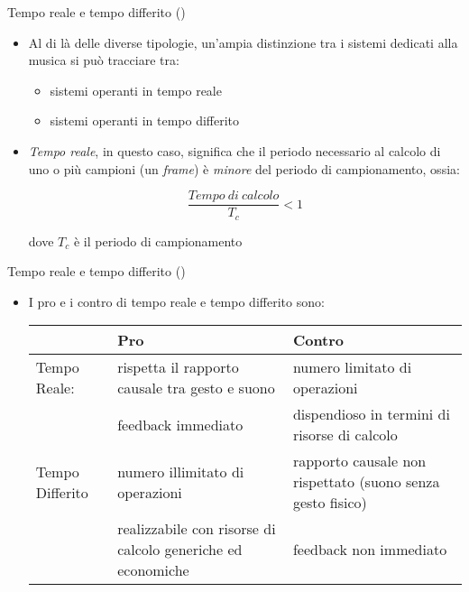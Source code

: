 \setcounter{ms}{1}
\begin{slide}{Tempo reale e tempo differito ()}
{

	\begin{itemize}
	\setlength{\itemsep}{2mm}

		\item Al di l\`a delle diverse tipologie,
		      un'ampia distinzione tra i sistemi dedicati alla musica
              si pu\`o tracciare tra:

			  \begin{itemize}

				\item sistemi operanti in tempo reale

				\item sistemi operanti in tempo differito

			  \end{itemize}

		\item \emph{Tempo reale}, in questo caso, significa che
			  il periodo necessario al calcolo di uno o pi\`u campioni
			  (un \emph{frame}) \`e \emph{minore} del periodo di campionamento,
			  ossia:

			  \begin{equation}
				\frac{Tempo~di~calcolo}{T_c} < 1 \nonumber
			  \end{equation}

              dove $T_c$ \`e il periodo di campionamento

	\end{itemize}
}
\end{slide}

\begin{slide}{Tempo reale e tempo differito ()}
{

	\begin{itemize}

		\item I pro e i contro di tempo reale e tempo differito sono:
		
			\vspace{2mm}
			{\scriptsize
			\begin{tabular}{| p{} | p{0.3\textwidth} | p{} |}
				\hline
					& {\centering\bfseries Pro} & {\centering\bfseries Contro}\\
				\hline
				Tempo Reale: & rispetta il rapporto causale
							   tra gesto e suono &
							   numero limitato di operazioni\\
							 & feedback immediato &
                               dispendioso in termini di risorse di calcolo\\
				\hline
				Tempo Differito & numero illimitato di operazioni &
								  rapporto causale non rispettato
								  (suono senza gesto fisico)\\
							 & realizzabile con risorse di
							   calcolo generiche ed economiche &
                               feedback non immediato\\
				\hline
			\end{tabular}
			}

	\end{itemize}
}
\end{slide}

